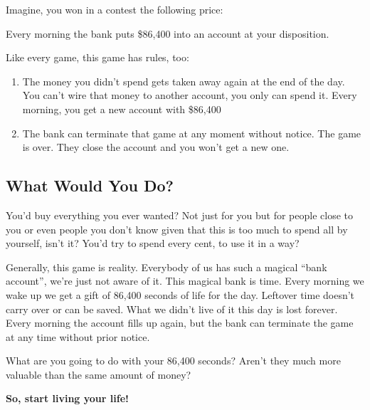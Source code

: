 \documentclass[../main.tex]{subfiles}
\begin{document}
Imagine, you won in a contest the following price:
\begin{center}
  Every morning the bank puts \$86,400 into an account at your disposition.
\end{center}

Like every game, this game has rules, too:

\begin{enumerate}
\item The money you didn't spend gets taken away again at the end of the day. You can't wire that money to another account, you only can spend it. Every morning, you get a new account with \$86,400
\item The bank can terminate that game at any moment without notice. The game is over. They close the account and you won't get a new one.
\end{enumerate}

\subsection{What Would You Do?}

You'd buy everything you ever wanted? Not just for you but for people close to you or even people you don't know given that this is too much to spend all by yourself, isn't it?
You'd try to spend every cent, to use it in a way?

Generally, this game is reality. Everybody of us has such a magical ``bank account'', we're just not aware of it. This magical bank is time. Every morning we wake up we get a gift of 86,400 seconds of life for the day. Leftover time doesn't carry over or can be saved. What we didn't live of it this day is lost forever.
Every morning the account fills up again, but the bank can terminate the game at any time without prior notice.

What are you going to do with your 86,400 seconds? Aren't they much more valuable than the same amount of money?

\begin{center}
  \textbf{So, start living your life!}
  \end{center}
\end{document}
